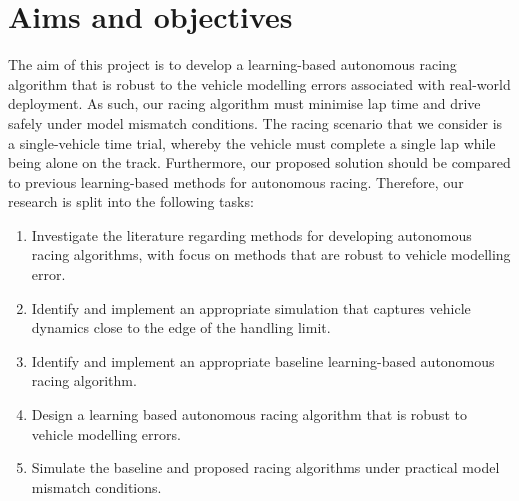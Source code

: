 


\section{Aims and objectives}\label{sec:objectives}

The aim of this project is to develop a learning-based autonomous racing algorithm that is robust to the vehicle modelling errors associated with real-world deployment.
As such, our racing algorithm must minimise lap time and drive safely under model mismatch conditions.
The racing scenario that we consider is a single-vehicle time trial, whereby the vehicle must complete a single lap while being alone on the track.
Furthermore, our proposed solution should be compared to previous learning-based methods for autonomous racing.
Therefore, our research is split into the following tasks:
\begin{enumerate}
    \item Investigate the literature regarding methods for developing autonomous racing algorithms, with focus on methods that are robust to vehicle modelling error.
    \item Identify and implement an appropriate simulation that captures vehicle dynamics close to the edge of the handling limit.
    \item Identify and implement an appropriate baseline learning-based autonomous racing algorithm.
    \item Design a learning based autonomous racing algorithm that is robust to vehicle modelling errors.
    \item Simulate the baseline and proposed racing algorithms under practical model mismatch conditions.
\end{enumerate}


